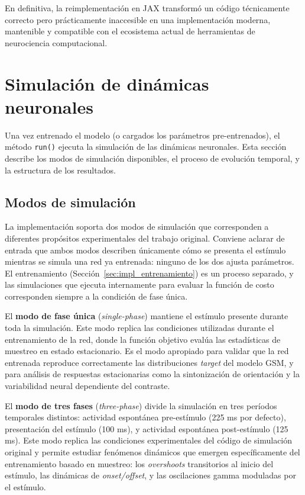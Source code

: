 En definitiva, la reimplementación en JAX transformó un código técnicamente correcto pero prácticamente inaccesible en una implementación moderna, mantenible y compatible con el ecosistema actual de herramientas de neurociencia computacional.


\section{Simulación de dinámicas neuronales}
\label{sec:impl_simulacion}

Una vez entrenado el modelo (o cargados los parámetros pre-entrenados), el método \texttt{run()} ejecuta la simulación de las dinámicas neuronales. Esta sección describe los modos de simulación disponibles, el proceso de evolución temporal, y la estructura de los resultados.

\subsection{Modos de simulación}
\label{subsec:impl_modos}

La implementación soporta dos modos de simulación que corresponden a diferentes propósitos experimentales del trabajo original. Conviene aclarar de entrada que ambos modos describen únicamente cómo se presenta el estímulo mientras se simula una red ya entrenada: ninguno de los dos ajusta parámetros. El entrenamiento (Sección~\ref{sec:impl_entrenamiento}) es un proceso separado, y las simulaciones que ejecuta internamente para evaluar la función de costo corresponden siempre a la condición de fase única.

El \textbf{modo de fase única} (\textit{single-phase}) mantiene el estímulo presente durante toda la simulación. Este modo replica las condiciones utilizadas durante el entrenamiento de la red, donde la función objetivo evalúa las estadísticas de muestreo en estado estacionario. Es el modo apropiado para validar que la red entrenada reproduce correctamente las distribuciones \textit{target} del modelo \acrshort{GSM}, y para análisis de respuestas estacionarias como la sintonización de orientación y la variabilidad neural dependiente del contraste.

El \textbf{modo de tres fases} (\textit{three-phase}) divide la simulación en tres períodos temporales distintos: actividad espontánea pre-estímulo (225 ms por defecto), presentación del estímulo (100 ms), y actividad espontánea post-estímulo (125 ms). Este modo replica las condiciones experimentales del código de simulación original y permite estudiar fenómenos dinámicos que emergen específicamente del entrenamiento basado en muestreo: los \textit{overshoots} transitorios al inicio del estímulo, las dinámicas de \textit{onset/offset}, y las oscilaciones gamma moduladas por el estímulo.

